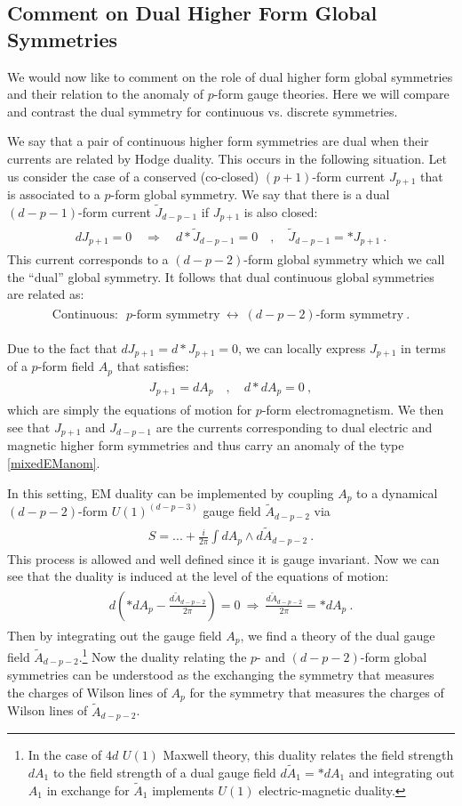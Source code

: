 \documentclass[11pt]{article}
\newcommand{\eq}[1]{\begin{align}\begin{split}#1\end{split}\end{align}}
\newcommand{\twopi}[1]{{\frac{#1}{2\pi}}}
\def\tJ{{\tilde{J}}}
\begin{document}
 
 

\subsection{Comment on Dual Higher Form Global Symmetries}
 

We would now like to comment on the role of dual higher form global symmetries and their relation to the anomaly of $p$-form gauge theories. Here we will compare and contrast the dual symmetry for continuous vs. discrete symmetries. 

We say that a pair of continuous higher form symmetries are dual when their currents are related by Hodge duality. This occurs in the following situation. Let us consider the case of a conserved (co-closed) $(p+1)$-form current $J_{p+1}$ that is associated to a $p$-form global symmetry. We say that there is a dual $(d-p-1)$-form current $\tJ_{d-p-1}$ if $J_{p+1}$ is also closed:  
\eq{
d J_{p+1}=0\quad\Rightarrow\quad d\ast\tJ_{d-p-1}=0\quad, \quad \tJ_{d-p-1}=\ast J_{p+1}~. 
}
This current corresponds to a $(d-p-2)$-form global symmetry which we call the ``dual'' global symmetry. It follows that dual continuous global symmetries are related as:
\eq{
\text{Continuous:~~}p\text{-form symmetry}~\longleftrightarrow ~(d-p-2)\text{-form symmetry}~.
} 

Due to the fact that $dJ_{p+1}=d\ast J_{p+1}=0$, we can locally express $J_{p+1}$ in terms of a $p$-form field $A_{p}$ that satisfies:
\eq{\label{discreteanom}
J_{p+1}=dA_p\quad, \quad d\ast d A_{p}=0~,
}
which are simply the equations of motion for $p$-form electromagnetism. 
We then see that $J_{p+1}$ and $J_{d-p-1}$ are the currents corresponding to dual electric and magnetic higher form symmetries and thus carry an anomaly of the type  \eqref{mixedEManom}. 

 
In this setting, EM duality can be implemented by 
coupling $A_p$ to a dynamical  $(d-p-2)$-form $U(1)^{(d-p-3)}$ gauge field $\tilde{A}_{d-p-2}$ via 
\eq{
S=...+\twopi{i} \int dA_{p}\wedge d\tilde{A}_{d-p-2}~. 
}
This process is allowed and well defined since it is gauge invariant. 
Now we can see that the duality is induced at the level of the equations of motion:
\eq{
d\left(\ast dA_{p}-\twopi{ d\tilde{A}_{d-p-2}}\right)=0~\Longrightarrow~ \twopi{d\tilde{A}_{d-p-2}}= \ast dA_{p}~.
}
Then by integrating out the gauge field $A_p$, we find a theory of the dual gauge field $\tilde{A}_{d-p-2}$.\footnote{
In the case of $4d$  $U(1)$ Maxwell theory, this duality relates the field strength $dA_1$ to the field strength of a dual gauge field $d\tilde{A}_1= \ast dA_1$ and integrating out $A_1$ in exchange for $\tilde{A}_1$ implements $U(1)$ electric-magnetic duality. }
Now the duality relating the $p$- and $(d-p-2)$-form global symmetries can be understood as the exchanging the symmetry that measures the charges of Wilson lines of $A_p$ for the symmetry that measures the charges of Wilson lines of $\tilde{A}_{d-p-2}$. 
\end{document}
